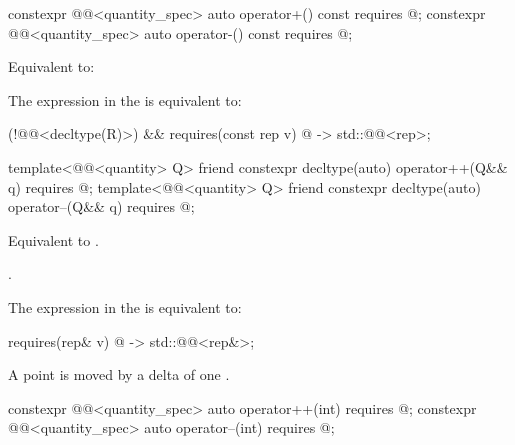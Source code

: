 \begin{itemdecl}
constexpr @@<quantity_spec> auto operator+() const
  requires @\seebelownc@;
constexpr @@<quantity_spec> auto operator-() const
  requires @\seebelownc@;
\end{itemdecl}

\begin{itemdescr}
\pnum
\effects
Equivalent to:

\pnum
\remarks
The expression in the  is equivalent to:
\begin{codeblock}
(!@@<decltype(R)>) && requires(const rep v) {
  { @\atsign@v } -> std::@@<rep>;
}
\end{codeblock}
\end{itemdescr}

\begin{itemdecl}
template<@@<quantity> Q>
friend constexpr decltype(auto) operator++(Q&& q)
  requires @\seebelownc@;
template<@@<quantity> Q>
friend constexpr decltype(auto) operator--(Q&& q)
  requires @\seebelownc@;
\end{itemdecl}

\begin{itemdescr}
\pnum
\effects
Equivalent to
.

\pnum
\returns
{}.

\pnum
\remarks
The expression in the  is equivalent to:
\begin{codeblock}
requires(rep& v) {
  { @\atsign@v } -> std::@@<rep&>;
}
\end{codeblock}
\begin{note}
A point is moved by a delta of one .
\end{note}
\end{itemdescr}

\begin{itemdecl}
constexpr @@<quantity_spec> auto operator++(int)
  requires @\seebelownc@;
constexpr @@<quantity_spec> auto operator--(int)
  requires @\seebelownc@;
\end{itemdecl}

